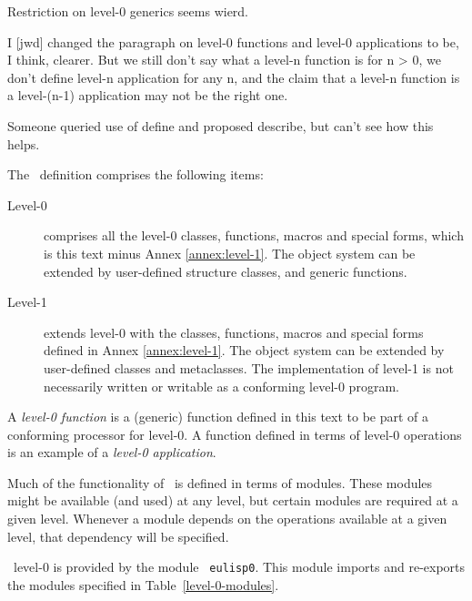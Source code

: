 \label{subsec:lang-struct}
%
\begin{optPrivate}
    Restriction on level-0 generics seems wierd.

    I [jwd] changed the paragraph on level-0 functions and level-0 applications
    to be, I think, clearer.  But we still don't say what a level-n function is
    for n > 0, we don't define level-n application for any n, and the claim that
    a level-n function is a level-(n-1) application may not be the right one.

    Someone queried use of define and proposed describe, but can't see how this
    helps.
\end{optPrivate}
%
\begin{optDefinition}
The \eulisp\ definition comprises the following items:
\begin{description}
    \item[Level-0] comprises all the
    level-0 classes, functions, macros and special forms, which is this text minus Annex \ref{annex:level-1}.  The object
    system can be extended by user-defined structure classes, and generic
    functions.

    \item[Level-1] extends level-0 with
    the classes, functions, macros and special forms defined in Annex
    \ref{annex:level-1}.  The object system can be extended by user-defined
    classes and metaclasses.  The implementation of level-1 is not
    necessarily written or writable as a conforming level-0 program.
\end{description}
%
A {\em level-0 function\/} is a (generic) function defined in this text to be
part of a conforming processor for level-0.  A function defined in terms of
level-0 operations is an example of a {\em level-0 application}.

Much of the functionality of \eulisp\ is defined in terms of
modules.  These modules might be
available (and used) at any level, but certain modules are required at a given
level.  Whenever a module depends on the operations available at a given level,
that dependency will be specified.

\eulisp\ level-0 is provided by the module {\tt
    eulisp0}.  This module imports and
re-exports the modules specified in Table~\ref{level-0-modules}.


\end{optDefinition}
